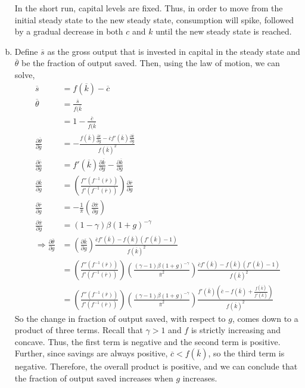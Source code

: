 \documentclass{article}
\newcommand{\olk}{\overline{k}}
\newcommand{\olc}{\overline{c}}
\newcommand{\olr}{\overline{r}}
\newcommand{\olpi}{\overline{\pi}}
\begin{document}
\begin{enumerate}[(a)]
	In the short run, capital levels are fixed. Thus, in order to move from the initial steady state to the new steady state, consumption will spike, followed by a gradual decrease in both $c$ and $k$ until the new steady state is reached.
	
	\pagebreak
	\item Define $\overline{s}$ as the gross output that is invested in capital in the steady state and $\overline{\theta}$ be the fraction of output saved. Then, using the law of motion, we can solve,
		\begin{align*}
			\overline{s} 	&= f(\overline{k}) - \overline{c}	\\
			\overline{\theta} &= \frac{\overline{s}}{f(\overline{k}} 	\\
							&= 1-\frac{\overline{c}}{f(\overline{k}}	\\
			\frac{\partial\overline{\theta}}{\partial g} &= -\frac{f(\overline{k})\frac{\partial\overline{c}}{\partial g}-\overline{c}f'(\overline{k})\frac{\partial\overline{k}}{\partial g}}{f(\overline{k})^2}	\\
			\frac{\partial\olc}{\partial g} &= f'(\olk)\frac{\partial\olk}{\partial g} - \frac{\partial\olk}{\partial g}	\\
			\frac{\partial\olk}{\partial g} &= \left(\frac{f''(f^{-1}(\olr))}{f'(f^{-1}(\olr))}\right)\frac{\partial\olr}{\partial g}	\\
			\frac{\partial\olr}{\partial g} &= -\frac{1}{\olpi}\left(\frac{\partial\olpi}{\partial g}\right)	\\
			\frac{\partial\olpi}{\partial g} &= (1-\gamma)\beta(1+g)^{-\gamma}	\\
\Rightarrow	\frac{\partial\overline{\theta}}{\partial g} &= \left(\frac{\partial\overline{k}}{\partial g}\right)\frac{\overline{c}f'(\overline{k})-f(\overline{k})(f'(\overline{k})-1)}{f(\overline{k})^2} 	\\
					&= \left(\frac{f''(f^{-1}(\olr))}{f'(f^{-1}(\olr))}\right)\left(\frac{(\gamma-1)\beta(1+g)^{-\gamma}}{\olpi^2}\right)\frac{\overline{c}f'(\overline{k})-f(\overline{k})(f'(\overline{k})-1)}{f(\overline{k})^2}	\\
					&= \left(\frac{f''(f^{-1}(\olr))}{f'(f^{-1}(\olr))}\right)\left(\frac{(\gamma-1)\beta(1+g)^{-\gamma}}{\olpi^2}\right)\frac{f'(\olk)\left(\overline{c}-f(\olk) + \frac{f(\olk)}{f'(\olk)}\right)}{f(\overline{k})^2}
		\end{align*}
		So the change in fraction of output saved, with respect to $g$, comes down to a product of three terms. Recall that $\gamma>1$ and $f$ is strictly increasing and concave. Thus, the first term is negative and the second term is positive. Further, since savings are always positive, ${\olc<f(\olk)}$, so the third term is negative. Therefore, the overall product is positive, and we can conclude that the fraction of output saved increases when $g$ increases.

\end{enumerate}
\end{document}
